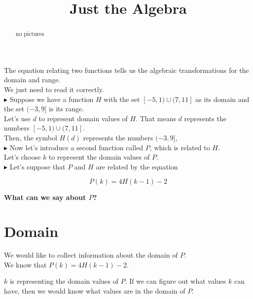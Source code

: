 \documentclass{ximera}
\title{Just the Algebra}
\begin{document}
\begin{abstract}
no pictures
\end{abstract}
\maketitle




The equation relating two functions tells us the algebraic transformations for the domain and range. \\

We just need to read it correctly. \\



\textbf{\textcolor{blue!55!black}{$\blacktriangleright$}}  Suppose we have a function $H$ with the set $[-5, 1) \cup (7, 11]$ as its domain and the set $(-3, 9]$ is its range. \\

Let's use $d$ to represent domain values of $H$.  That means $d$ represents the numbers $[-5, 1) \cup (7, 11]$. \\

Then, the symbol $H(d)$ represents the numbers $(-3, 9]$, \\


\textbf{\textcolor{blue!55!black}{$\blacktriangleright$}} Now let's introduce a second function called $P$, which is related to $H$. \\

Let's choose $k$ to represent the domain values of $P$. \\


\textbf{\textcolor{blue!55!black}{$\blacktriangleright$}} Let's suppose that $P$ and $H$ are related by the equation 

\[ 
P(k) = 4 H(k-1) - 2
\]



\textbf{\textcolor{blue!55!black}{What can we say about $P$?}}  \\



\section*{Domain}


We would like to collect information about the domain of $P$. \\

We know that $P(k) = 4 H(k-1) - 2$.

$k$ is representing the domain values of $P$.  If we can figure out what values $k$ can have, then we would know what values are in the domain of $P$. \\
\end{document}
